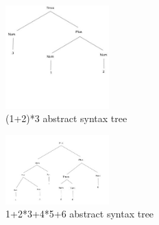 \documentclass{article}
\theoremstyle{theorem}
\theoremstyle{definition}
\theoremstyle{remark}
\begin{document}
 \begin{figure}[htp]
    \centering
    \includegraphics[width=4cm]{4th (2)}
    \caption{(1+2)*3  abstract syntax tree}
    \label{fig:(1+2)*3}
\end{figure}
 \begin{figure}[htp]
    \centering
    \includegraphics[width=4cm]{5}
    \caption{1+2*3+4*5+6  abstract syntax tree}
    \label{fig:1+2*3+4*5+6}
\end{figure}
\end{document}
